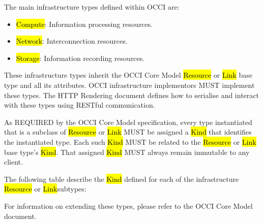 \documentclass[10pt,a4paper]{article}
\begin{document}
The main infrastructure types defined within OCCI are:
\begin{itemize}
\item \hl{Compute}: Information processing resources.
\item \hl{Network}: Interconnection resources.
\item \hl{Storage}: Information recording resources.
\end{itemize}
These infrastructure types inherit the OCCI Core Model \hl{Resource} or \hl{Link} base type and all its 
attributes. OCCI infrastructure implementors MUST implement these types. The HTTP 
Rendering document defines how to serialise and interact with these types 
using RESTful communication.

As REQUIRED by the OCCI Core Model specification, every type instantiated that is 
a subclass of \hl{Resource} or \hl{Link} MUST be assigned a \hl{Kind} that identifies the instantiated 
type. Each such \hl{Kind} MUST be related to the \hl{Resource} or \hl{Link} base type's \hl{Kind}. 
That assigned \hl{Kind} MUST always remain immutable to any client.

The following table describe the \hl{Kind} defined for each of the infrastructure \hl{Resource} 
or \hl{Link}subtypes:


For information on extending these types, please refer to the OCCI Core Model document.
\end{document}
